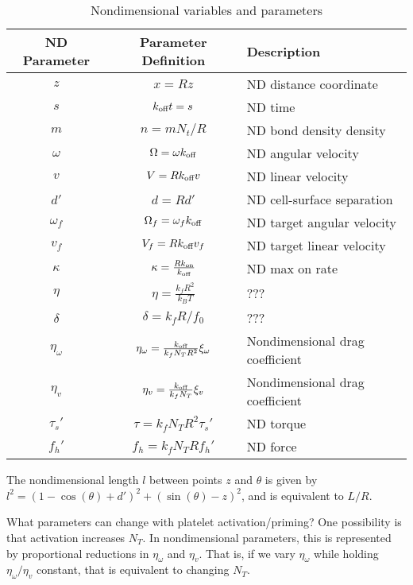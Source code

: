 \documentclass{article}
\newcommand{\tn}{\textnormal}
\begin{document}
\begin{table}
  \centering
  \begin{tabular}{c|c|l}
    ND Parameter & Parameter Definition & Description \\
    \hline
    $z$ & $x = Rz$ & ND distance coordinate \\
    $s$ & $k_\tn{off} t = s$ & ND time \\
    $m$ & $n = m N_t/R$ & ND bond density density \\
    $\omega$ & $\Omega = \omega k_\tn{off}$ & ND angular velocity \\
    $v$ & $V = R k_\tn{off} v$ & ND linear velocity \\
    $d'$ & $d = R d'$ & ND cell-surface separation \\
    $\omega_f$ & $\Omega_f = \omega_f k_\tn{off}$ & ND target angular
                                                    velocity \\ 
    $v_f$ & $V_f = R k_\tn{off} v_f$ & ND target linear velocity \\ 
    $\kappa$ & $\kappa = \frac{R k_\tn{on}}{k_\tn{off}}$ & ND max on
                                                           rate \\
    $\eta$ & $\eta = \frac{k_f R^2}{k_B T}$ & ??? \\
    $\delta$ & $\delta = k_f R/f_0$ & ??? \\
    $\eta_\omega$ & $\eta_\omega = \frac{k_\tn{off}}{k_f N_T R^2}
                    \xi_\omega$ & Nondimensional drag coefficient \\ 
    $\eta_v$ & $\eta_v = \frac{k_\tn{off}}{k_f N_T} \xi_v$ &
                                                             Nondimensional drag
                                                             coefficient
    \\
    $\tau_s'$ & $\tau = k_f N_T R^2 \tau_s'$ & ND torque \\
    $f_h'$ & $f_h = k_f N_T R f_h'$ & ND force \\
  \end{tabular}
  \caption{Nondimensional variables and parameters}
  \label{tab:nd-vars}
\end{table}

The nondimensional length $l$ between points $z$ and $\theta$ is
given by $l^2 = (1 - \cos(\theta) + d')^2 + (\sin(\theta) - z)^2$, and
is equivalent to $L/R$. 

What parameters can change with platelet activation/priming? One
possibility is that activation increases $N_T$. In nondimensional
parameters, this is represented by proportional reductions in
$\eta_\omega$ and $\eta_v$. That is, if we vary $\eta_\omega$ while
holding $\eta_\omega/\eta_v$ constant, that is equivalent to changing
$N_T$. 
\end{document}
